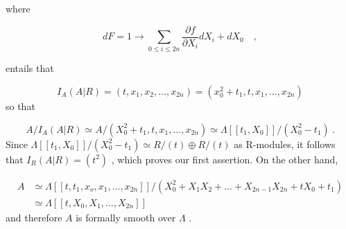 \begin{center}
\end{center}
where

\begin{equation*}
dF = 1 \to \sum_{0 \leq i \leq 2n} \frac{\partial f}{\partial X_i} dX_i + dX_0 \quad , 
\end{equation*}


 entails that

\begin{equation*}
I_A(A|R) = (t, x_1, x_2, \ldots, x_{2n}) = (x_0^2 + t_1, t, x_1, \ldots, x_{2n})
\end{equation*}
so that

\begin{equation*}
A/I_A(A|R) \simeq A/(X_0^2 + t_1, t, x_1, \ldots, x_{2n}) \simeq \Lambda[[t_1, X_0]]/(X_0^2 - t_1)  \ .
\end{equation*}
Since  $\Lambda[[t_1, X_0]]/(X_0^2 - t_1) \simeq R/(t) \oplus R/(t)$  as R-modules, it follows that $I_R(A|R) = (t^2)$  , which proves our first assertion. On the other hand,

\begin{equation*}
\begin{aligned} A &\simeq \Lambda[[t, t_1, x_o, x_1, \ldots, x_{2n}]]/(X_0^2 + X_1X_2 + \ldots + X_{2n-1}X_{2n} + tX_0 + t_1) \\ &\simeq \Lambda[[t, X_0, X_1,\ldots,X_{2n}]] \end{aligned}
\end{equation*}
and therefore  $A$  is formally smooth over  $\Lambda$  .

